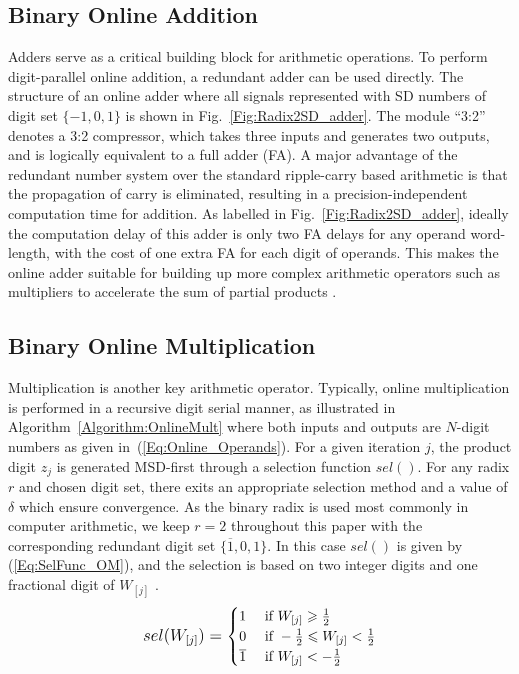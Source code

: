 \documentclass[conference]{IEEEtran}
\begin{document}
\subsection{Binary Online Addition}\vspace{-0.5ex}
Adders serve as a critical building block for arithmetic operations. To perform digit-parallel online addition, a redundant adder can be used directly. The structure of an online adder where all signals represented with SD numbers of digit set $\{-1,0,1\}$ is shown in Fig.~\ref{Fig:Radix2SD_adder}. The module ``3:2'' denotes a 3:2 compressor, which takes three inputs and generates two outputs, and is logically equivalent to a full adder (FA). A major advantage of the redundant number system over the standard ripple-carry based arithmetic is that the propagation of carry is eliminated, resulting in a precision-independent computation time for addition. As labelled in Fig.~\ref{Fig:Radix2SD_adder}, ideally the computation delay of this adder is only two FA delays for any operand word-length, with the cost of one extra FA for each digit of operands. This makes the online adder suitable for building up more complex arithmetic operators such as multipliers to accelerate the sum of partial products \cite{RedundantMult_1987}.\vspace{-0.5ex}
%



\subsection{Binary Online Multiplication}\vspace{-0.5ex}
Multiplication is another key arithmetic operator. Typically, online multiplication is performed in a recursive digit serial manner, as illustrated in Algorithm~\ref{Algorithm:OnlineMult} \cite{Ercegovac_OnlineMult} where both inputs and outputs are $N$-digit numbers as given in~(\ref{Eq:Online_Operands}). For a given iteration $j$, the product digit $z_j$ is generated MSD-first through a selection function $sel()$. For any radix $r$ and chosen digit set, there exits an appropriate selection method and a value of $\delta$ which ensure convergence. As the binary radix is used most commonly in computer arithmetic, we keep $r=2$ throughout this paper with the corresponding redundant digit set $\{\overline{1},0,1\}$. In this case $sel()$ is given by (\ref{Eq:SelFunc_OM}), and the selection is based on two integer digits and one fractional digit of $W_{[j]}$ \cite{Ercegovac_OnlineMult}.\vspace{-0.5ex}
%
\begin{eqnarray}\label{Eq:SelFunc_OM}
\small
  sel(W_{[j]})=\begin{cases}
    1 & \text{ if } W_{[j]} \geqslant \frac{1}{2} \\
    0 & \text{ if } -\frac{1}{2}\leqslant W_{[j]}<\frac{1}{2} \\
    \overline{1} & \text{ if } W_{[j]}<-\frac{1}{2}
  \end{cases}
\normalsize
\end{eqnarray}
\end{document}
